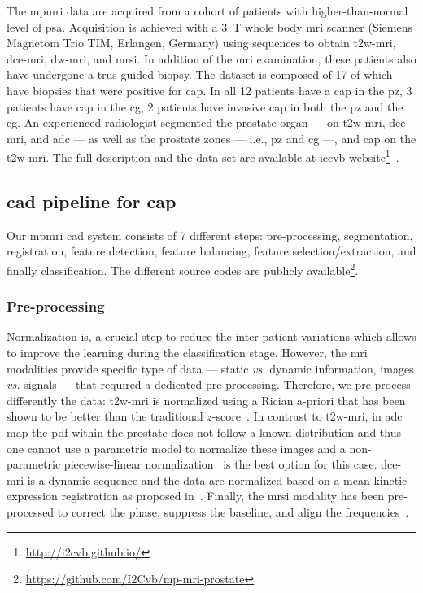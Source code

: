 \documentclass[conference]{sty/ieeeconf}
\begin{document}
The \ac{mpmri} data are acquired from a cohort of patients with
higher-than-normal level of \ac{psa}.
Acquisition is achieved with a \SI{3}{\tesla} whole body
\ac{mri} scanner (Siemens Magnetom Trio TIM, Erlangen, Germany) using
sequences to obtain \ac{t2w}-\ac{mri}, \ac{dce}-\ac{mri},
\ac{dw}-\ac{mri}, and \ac{mrsi}.
In addition of the \ac{mri} examination, these patients also have undergone
a \ac{trus} guided-biopsy.
The dataset is composed of 17 of which have biopsies that were positive for
\ac{cap}.
In all 12 patients have a \ac{cap} in the \ac{pz}, 3 patients
have \ac{cap} in the \ac{cg}, 2 patients have invasive \ac{cap} in
both the \ac{pz} and the \ac{cg}.
An experienced radiologist segmented the prostate organ --- on
\ac{t2w}-\ac{mri}, \ac{dce}-\ac{mri}, and \ac{adc} --- as
well as the prostate zones --- i.e., \ac{pz} and \ac{cg} ---, and
\ac{cap} on the \ac{t2w}-\ac{mri}.
The full description and the data set are available at \acs*{iccvb}
website\footnote{\url{http://i2cvb.github.io/}}~\cite{Lemaitre2016thesis}.

\subsection{\acs*{cad} pipeline for \acs*{cap}}

Our \ac{mpmri} \ac{cad} system consists of 7 different steps:
pre-processing, segmentation, registration, feature detection, feature
balancing, feature selection/extraction, and finally classification.
The different source codes are publicly
available\footnote{\url{https://github.com/I2Cvb/mp-mri-prostate}}.

\subsubsection{Pre-processing}\label{subsec:chp6:method:PP}

Normalization is, a crucial step to reduce the inter-patient
variations which allows to improve the learning during the
classification stage.
However, the \ac{mri} modalities provide specific type of data --- static
\emph{vs.} dynamic information, images \emph{vs.} signals --- that
required a dedicated pre-processing.
Therefore, we pre-process differently the data:
\ac{t2w}-\ac{mri} is normalized using a Rician
a-priori that has been shown to be better than the traditional
$z$-score~\cite{lemaitre2016normalization}.
In contrast to \ac{t2w}-\ac{mri}, in \ac{adc} map the \ac{pdf} within the
prostate does not follow a known distribution and thus one cannot use
a parametric model to normalize these images and a non-parametric
piecewise-linear normalization~\cite{Nyul2000} is the best option for
this case.
\ac{dce}-\ac{mri} is a dynamic sequence and the data are normalized
based on a mean kinetic expression registration as proposed
in~\cite{Lemaitre2016thesis}.
Finally, the \ac{mrsi} modality has been pre-processed to correct the
phase, suppress the baseline, and align the frequencies~\cite{Parfait2012}.
\end{document}
